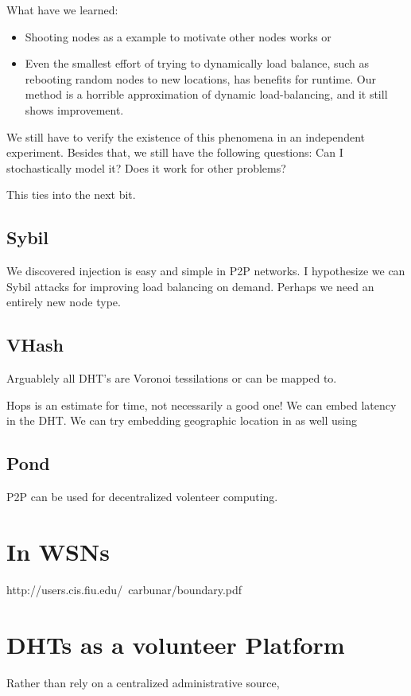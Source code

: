 What have we learned:
\begin{itemize}
	\item Shooting nodes as a example to motivate other nodes works or
	\item Even the smallest effort of trying to dynamically load  balance, such as rebooting random nodes to new locations, has benefits for runtime.
	Our method is a horrible approximation of dynamic load-balancing, and it still shows improvement.
\end{itemize}



We still have to verify the existence of this phenomena in an independent experiment.
Besides that, we still have the following questions:
Can I stochastically model it?
Does it work for other problems?


This ties into the next bit.
\subsection{Sybil}
We discovered injection is easy and simple in P2P networks.
I hypothesize we can Sybil attacks for improving load balancing on demand.
Perhaps we need an entirely new node type.

\subsection{VHash}
Arguablely all DHT's are Voronoi tessilations or can be mapped to.


Hops is an estimate for time, not necessarily a good one!
We can embed latency in the DHT.
We can try embedding geographic location in as well using




\subsection{Pond}
P2P can be used for decentralized volenteer computing.





\section{In WSNs}
http://users.cis.fiu.edu/~carbunar/boundary.pdf


\section{DHTs as a volunteer Platform}
Rather than rely on a centralized administrative source,


